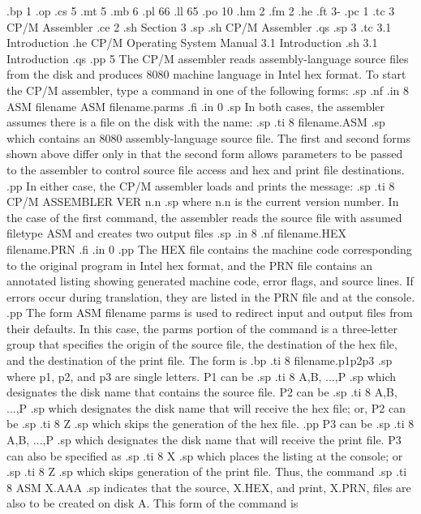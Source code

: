 .bp 1
.op
.cs 5
.mt 5
.mb 6
.pl 66
.ll 65
.po 10
.hm 2
.fm 2
.he
.ft                                3-%
.pc 1
.tc 3  CP/M Assembler
.ce 2
.sh
Section 3
.sp
.sh
CP/M Assembler
.qs
.sp 3
.tc    3.1  Introduction
.he CP/M Operating System Manual                    3.1  Introduction
.sh
3.1  Introduction
.qs
.pp 5
The CP/M assembler reads assembly-language source files from the 
disk and produces 8080 machine language in Intel hex format.  
To start the CP/M assembler, type a command in one of the 
following forms:
.sp
.nf
.in 8
ASM filename
ASM filename.parms
.fi
.in 0
.sp
In both cases, the assembler assumes there is a file on the
disk with the name:
.sp
.ti 8
filename.ASM
.sp
which contains an 8080 assembly-language source file.  The first
and second forms shown above differ only in that the second form
allows parameters to be passed to the assembler to control source
file access and hex and print file destinations.
.pp
In either case, the CP/M assembler loads and prints the message:
.sp
.ti 8
CP/M ASSEMBLER VER n.n
.sp
where n.n is the current version number.  In the case of the 
first command, the assembler reads the source file with assumed 
filetype ASM and creates two output files
.sp
.in 8
.nf
filename.HEX
filename.PRN
.fi
.in 0
.pp
The HEX file contains the machine code corresponding to the 
original program in Intel hex format, and the PRN file contains 
an annotated listing showing generated machine code, error flags, 
and source lines.  If errors occur during translation, they are
listed in the PRN file and at the console.
.pp
The form ASM filename parms is used to redirect input and 
output files from their defaults.  In this case, the parms 
portion of the command is a three-letter group that specifies the 
origin of the source file, the destination of the hex file, and 
the destination of the print file.  The form is
.bp
.ti 8
filename.p1p2p3
.sp
where p1, p2, and p3 are single letters.  P1 can be
.sp
.ti 8
A,B, ...,P
.sp
which designates the disk name that contains the source file.  P2 
can be
.sp
.ti 8
A,B, ...,P
.sp
which designates the disk name that will receive the hex file; or, P2 
can be 
.sp
.ti 8
Z
.sp
which skips the generation of the hex file.
.pp
P3 can be
.sp
.ti 8
A,B, ...,P
.sp
which designates the disk name that will receive the 
print file.  P3 can also be specified as
.sp
.ti 8
X
.sp
which places the listing at the console; or
.sp
.ti 8
Z
.sp
which skips generation of the print file.  Thus, the command
.sp
.ti 8
ASM X.AAA
.sp
indicates that the source, X.HEX, and print, X.PRN, files 
are also to be created on disk A.  This form of the command is 
